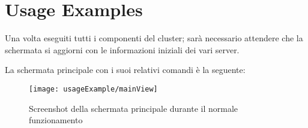 \section{Usage Examples}
Una volta eseguiti tutti i componenti del cluster; sarà necessario attendere che la schermata si aggiorni con le informazioni iniziali dei vari server.

La schermata principale con i suoi relativi comandi è la seguente:

\begin{figure}[H]
	\centering
	\texttt{[image: usageExample/mainView]}
	\caption[usageExampleCaption]{Screenshot della schermata principale durante il normale funzionamento}
	\label{fig:figure15}
\end{figure}

